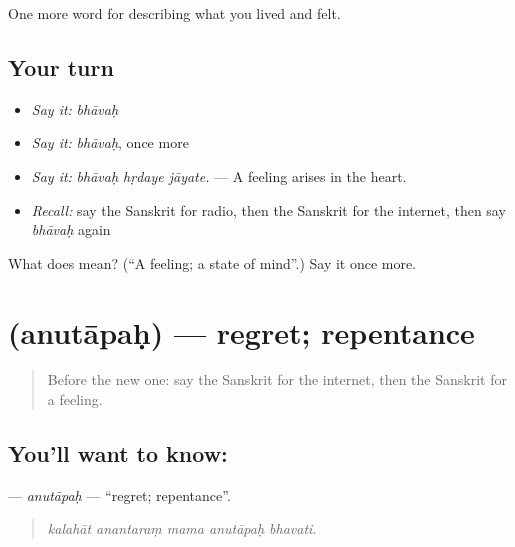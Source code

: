 \begin{grammarlens}[title={What you've built}]
One more word for describing what you lived and felt.
\end{grammarlens}

\subsection*{Your turn}
\begin{itemize}
\raggedright
  \item \emph{Say it:} \emph{bhāvaḥ}
  \item \emph{Say it:} \emph{bhāvaḥ}, once more
  \item \emph{Say it:} \emph{bhāvaḥ hṛdaye jāyate.} — A feeling arises in the heart.
  \item \emph{Recall:} say the Sanskrit for radio, then the Sanskrit for the internet, then say \emph{bhāvaḥ} again
\end{itemize}

\begin{tcolorbox}[breakable,colback=teal!4,colframe=teal!35!black,title={Before you move on}]
What does  mean? (\textquotedblleft{}A feeling; a state of mind\textquotedblright{}.) Say it once more.
\end{tcolorbox}
\section[\texorpdfstring{\sk{अनुतापः} (anutāpaḥ)}{अनुतापः (anutāpaḥ)}]{ (anutāpaḥ) — regret; repentance}

\label{lesson:SA-C448-anutapah}



\begin{quote}
Before the new one: say the Sanskrit for the internet, then the Sanskrit for a feeling.
\end{quote}

\subsection*{You'll want to know: }
\textbf{} — \emph{anutāpaḥ} — \textquotedblleft{}regret; repentance\textquotedblright{}.

\begin{quote}
    
\end{quote}

\begin{quote}
\emph{kalahāt anantaraṃ mama anutāpaḥ bhavati.}
\end{quote}


